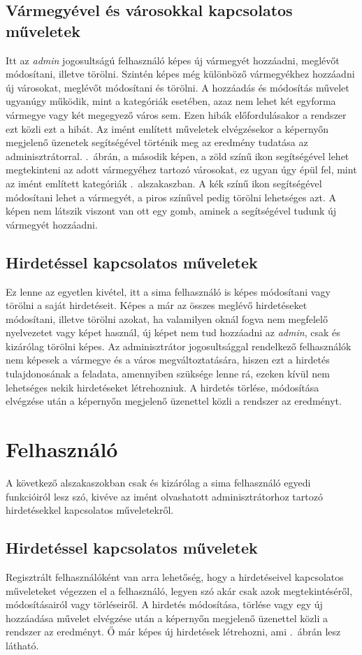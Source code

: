 \documentclass[]{thesis-ekf}
\theoremstyle{definition}
\theoremstyle{remark}
\begin{document}
	\subsection{Vármegyével és városokkal kapcsolatos műveletek}
		Itt az \emph{admin} jogosultságú felhasználó képes új vármegyét hozzáadni, meglévőt módosítani, illetve törölni. Szintén képes még különböző vármegyékhez hozzáadni új városokat, meglévőt módosítani és törölni. A hozzáadás és módosítás művelet ugyanúgy működik, mint a kategóriák esetében, azaz nem lehet két egyforma vármegye vagy két megegyező város sem. Ezen hibák előfordulásakor a rendszer ezt közli ezt a hibát. Az imént említett műveletek elvégzésekor a képernyőn megjelenő üzenetek segítségével történik meg az eredmény tudatása az adminisztrátorral. .~ábrán, a második képen, a zöld színű ikon segítségével lehet megtekinteni az adott vármegyéhez tartozó városokat, ez ugyan úgy épül fel, mint az imént említett kategóriák .~alszakaszban. A kék színű ikon segítségével módosítani lehet a vármegyét, a piros színűvel pedig törölni lehetséges azt. A képen nem látszik viszont van ott egy gomb, aminek a segítségével tudunk új vármegyét hozzáadni.
	\subsection{Hirdetéssel kapcsolatos műveletek}
		Ez lenne az egyetlen kivétel, itt a sima felhasználó is képes módosítani vagy törölni a saját hirdetéseit. Képes a már az összes meglévő hirdetéseket módosítani, illetve törölni azokat, ha valamilyen oknál fogva nem megfelelő nyelvezetet vagy képet használ, új képet nem tud hozzáadni az \emph{admin}, csak és kizárólag törölni képes. Az adminisztrátor jogosultsággal rendelkező felhasználók nem képesek a vármegye és a város megváltoztatására, hiszen ezt a hirdetés tulajdonosának a feladata, amennyiben szüksége lenne rá, ezeken kívül nem lehetséges nekik hirdetéseket létrehozniuk. A hirdetés törlése, módosítása elvégzése után a képernyőn megjelenő üzenettel közli a rendszer az eredményt.
	\section{Felhasználó}
		A következő alszakaszokban csak és kizárólag a sima felhasználó egyedi funkcióiról lesz szó, kivéve az imént olvashatott adminisztrátorhoz tartozó hirdetésekkel kapcsolatos műveletekről.
	\subsection{Hirdetéssel kapcsolatos műveletek}
		Regisztrált felhasználóként van arra lehetőség, hogy a hirdetéseivel kapcsolatos műveleteket végezzen el a felhasználó, legyen szó akár csak azok megtekintéséről, módosításairól vagy törléseiről. A hirdetés módosítása, törlése vagy egy új hozzáadása művelet elvégzése után a képernyőn megjelenő üzenettel közli a rendszer az eredményt. Ő már képes új hirdetések létrehozni, ami .~ábrán lesz látható.
		
\end{document}
